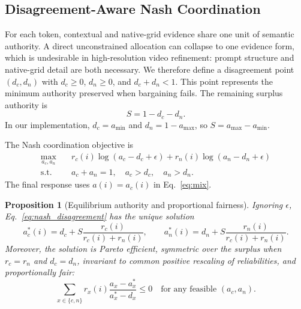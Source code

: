 \documentclass[10pt,twocolumn]{article}
\newtheorem{proposition}{Proposition}
\begin{document}
\subsection{Disagreement-Aware Nash Coordination}

For each token, contextual and native-grid evidence share one unit of semantic authority. A direct unconstrained allocation can collapse to one evidence form, which is undesirable in high-resolution video refinement: prompt structure and native-grid detail are both necessary. We therefore define a disagreement point $(d_c,d_n)$ with $d_c\geq0$, $d_n\geq0$, and $d_c+d_n<1$. This point represents the minimum authority preserved when bargaining fails. The remaining surplus authority is
\begin{equation}
    S=1-d_c-d_n.
\end{equation}
In our implementation, $d_c=a_{\min}$ and $d_n=1-a_{\max}$, so $S=a_{\max}-a_{\min}$.

The Nash coordination objective is
\begin{equation}
\begin{aligned}
    \max_{a_c,a_n}\quad&
    r_c(i)\log(a_c-d_c+\epsilon)
    +r_n(i)\log(a_n-d_n+\epsilon)\\
    \text{s.t.}\quad&
    a_c+a_n=1,\quad a_c>d_c,\quad a_n>d_n .
\end{aligned}
    \label{eq:nash_disagreement}
\end{equation}
The final response uses $a(i)=a_c(i)$ in Eq.~\eqref{eq:mix}.

\begin{proposition}[Equilibrium authority and proportional fairness]
Ignoring $\epsilon$, Eq.~\eqref{eq:nash_disagreement} has the unique solution
\begin{equation}
    a_c^*(i)=d_c+S
    \frac{r_c(i)}
    {r_c(i)+r_n(i)},\qquad
    a_n^*(i)=d_n+S
    \frac{r_n(i)}
    {r_c(i)+r_n(i)} .
    \label{eq:closed_disagreement}
\end{equation}
Moreover, the solution is Pareto efficient, symmetric over the surplus when $r_c=r_n$ and $d_c=d_n$, invariant to common positive rescaling of reliabilities, and proportionally fair:
\begin{equation}
    \sum_{x\in\{c,n\}}
    r_x(i)
    \frac{a_x-a_x^*}
    {a_x^*-d_x}
    \leq 0
    \quad
    \text{for any feasible } (a_c,a_n).
    \label{eq:prop_fair}
\end{equation}
\end{proposition}
\end{document}

